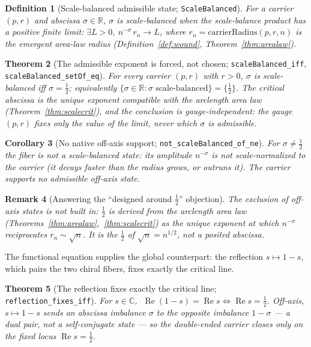 \documentclass[11pt]{article}
\newtheorem{definition}{Definition}[section]
\newtheorem{theorem}[definition]{Theorem}
\newtheorem{corollary}[definition]{Corollary}
\newtheorem{remark}[definition]{Remark}
\DeclareMathOperator{\Ree}{Re}
\newcommand{\C}{\mathbb{C}}
\newcommand{\R}{\mathbb{R}}
\newcommand{\code}[1]{\texttt{#1}}
\begin{document}
\begin{definition}[Scale-balanced admissible state; \code{ScaleBalanced}]\label{def:admissible}
For a carrier $(p,r)$ and abscissa $\sigma\in\R$, $\sigma$ is \emph{scale-balanced} when the
scale-balance product has a positive finite limit: $\exists L>0,\ n^{-\sigma}\,r_n\to L$, where
$r_n=\mathrm{carrierRadius}(p,r,n)$ is the emergent area-law radius (Definition~\ref{def:wound},
Theorem~\ref{thm:arealaw}).
\end{definition}

\begin{theorem}[The admissible exponent is forced, not chosen; \code{scaleBalanced\_iff}, \code{scaleBalanced\_setOf\_eq}]\label{thm:admissible}
For every carrier $(p,r)$ with $r>0$, $\sigma$ is scale-balanced \emph{iff} $\sigma=\tfrac12$;
equivalently $\{\sigma\in\R:\sigma\text{ scale-balanced}\}=\{\tfrac12\}$. The critical abscissa is the
\emph{unique} exponent compatible with the arclength area law (Theorem~\ref{thm:scalecrit}), and the
conclusion is gauge-independent: the gauge $(p,r)$ fixes only the value of the limit, never which
$\sigma$ is admissible.
\end{theorem}

\begin{corollary}[No native off-axis support; \code{not\_scaleBalanced\_of\_ne}]\label{cor:offaxis}
For $\sigma\neq\tfrac12$ the fiber is \emph{not} a scale-balanced state: its amplitude $n^{-\sigma}$ is
not scale-normalized to the carrier (it decays faster than the radius grows, or outruns it). The
carrier supports no admissible off-axis state.
\end{corollary}

\begin{remark}[Answering the ``designed around $\tfrac12$'' objection]\label{rem:notchosen}
The exclusion of off-axis states is not built in: $\tfrac12$ is \emph{derived} from the arclength area
law (Theorems~\ref{thm:arealaw},~\ref{thm:scalecrit}) as the unique exponent at which $n^{-\sigma}$
reciprocates $r_n\sim\sqrt n$. It is the $\tfrac12$ of $\sqrt n=n^{1/2}$, not a posited abscissa.
\end{remark}

The functional equation supplies the global counterpart: the reflection $s\mapsto1-s$, which pairs the
two chiral fibers, fixes exactly the critical line.

\begin{theorem}[The reflection fixes exactly the critical line; \code{reflection\_fixes\_iff}]\label{thm:reflfix}
For $s\in\C$, $\;\Ree(1-s)=\Ree s\iff\Ree s=\tfrac12$. Off-axis, $s\mapsto1-s$ sends an abscissa
imbalance $\sigma$ to the opposite imbalance $1-\sigma$ --- a dual \emph{pair}, not a self-conjugate
state --- so the double-ended carrier closes only on the fixed locus $\Ree s=\tfrac12$.
\end{theorem}
\end{document}
